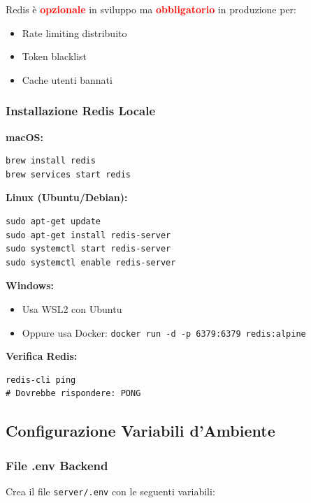 \documentclass[11pt,a4paper]{article}
\newcommand{\code}[1]{\texttt{#1}}
\newcommand{\important}[1]{\textcolor{red}{\textbf{#1}}}
\begin{document}
Redis è \important{opzionale} in sviluppo ma \important{obbligatorio} in produzione per:
\begin{itemize}
    \item Rate limiting distribuito
    \item Token blacklist
    \item Cache utenti bannati
\end{itemize}

\subsubsection{Installazione Redis Locale}

\textbf{macOS:}
\begin{lstlisting}
brew install redis
brew services start redis
\end{lstlisting}

\textbf{Linux (Ubuntu/Debian):}
\begin{lstlisting}
sudo apt-get update
sudo apt-get install redis-server
sudo systemctl start redis-server
sudo systemctl enable redis-server
\end{lstlisting}

\textbf{Windows:}
\begin{itemize}
    \item Usa WSL2 con Ubuntu
    \item Oppure usa Docker: \code{docker run -d -p 6379:6379 redis:alpine}
\end{itemize}

\textbf{Verifica Redis:}
\begin{lstlisting}
redis-cli ping
# Dovrebbe rispondere: PONG
\end{lstlisting}

\subsection{Configurazione Variabili d'Ambiente}

\subsubsection{File .env Backend}

Crea il file \code{server/.env} con le seguenti variabili:
\end{document}
